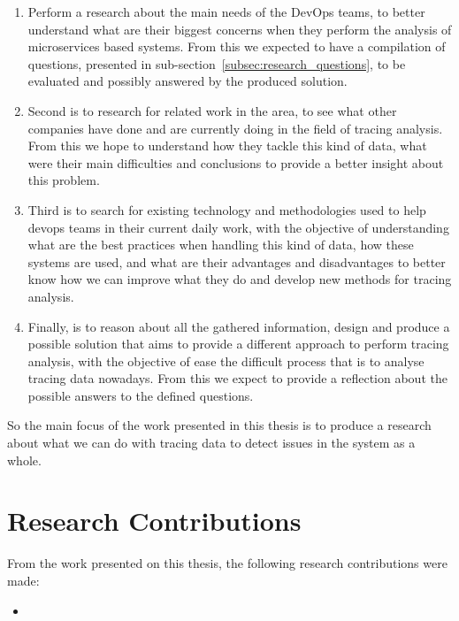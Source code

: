 \begin{enumerate}
    \item Perform a research about the main needs of the DevOps teams, to better understand what are their biggest concerns when they perform the analysis of microservices based systems. From this we expected to have a compilation of questions, presented in sub-section~\ref{subsec:research_questions}, to be evaluated and possibly answered by the produced solution.
    \item Second is to research for related work in the area, to see what other companies have done and are currently doing in the field of tracing analysis. From this we hope to understand how they tackle this kind of data, what were their main difficulties and conclusions to provide a better insight about this problem.
    \item Third is to search for existing technology and methodologies used to help \gls{devops} teams in their current daily work, with the objective of understanding what are the best practices when handling this kind of data, how these systems are used, and what are their advantages and disadvantages to better know how we can improve what they do and develop new methods for tracing analysis.
    \item Finally, is to reason about all the gathered information, design and produce a possible solution that aims to provide a different approach to perform tracing analysis, with the objective of ease the difficult process that is to analyse tracing data nowadays. From this we expect to provide a reflection about the possible answers to the defined questions.
\end{enumerate}

So the main focus of the work presented in this thesis is to produce a research about what we can do with tracing data to detect issues in the system as a whole.

\section{Research Contributions}
\label{sec:research_contributions}

From the work presented on this thesis, the following research contributions were made:

\begin{itemize}
    \item {}
\end{itemize}

